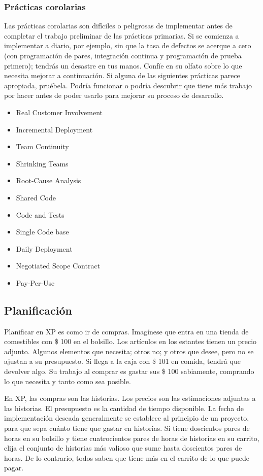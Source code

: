 \begin{spacing}{1.5}
		\subsubsection{Pr\'{a}cticas corolarias}
				Las prácticas corolarias son difíciles o peligrosas de implementar antes de completar el trabajo preliminar de las prácticas primarias. Si se comienza a implementar a diario, por ejemplo, sin que la tasa de defectos se acerque a cero (con programación de pares, integración continua y programación de prueba primero); tendrás un desastre en tus manos. Confíe en su olfato sobre lo que necesita mejorar a continuación. Si alguna de las siguientes prácticas parece apropiada, pruébela. Podría funcionar o podría descubrir que tiene más trabajo por hacer antes de poder usarlo para mejorar su proceso de desarrollo.
				\begin{itemize}
					\item Real Customer Involvement
					\item Incremental Deployment
					\item Team Continuity
					\item Shrinking Teams
					\item Root-Cause Analysis
					\item Shared Code
					\item Code and Tests
					\item Single Code base
					\item Daily Deployment
					\item Negotiated Scope Contract
					\item Pay-Per-Use
				\end{itemize}
	\subsection{Planificaci\'{o}n}
				Planificar en XP es como ir de compras. Imagínese que entra en una tienda de comestibles con \$ 100 en el bolsillo. Los artículos en los estantes tienen un precio adjunto. Algunos elementos que necesita; otros no; y otros que desee, pero no se ajustan a su presupuesto. Si llega a la caja con \$ 101 en comida, tendrá que devolver algo. Su trabajo al comprar es gastar sus \$ 100 sabiamente, comprando lo que necesita y tanto como sea posible.
				
				En XP, las compras son las historias. Los precios son las estimaciones adjuntas a las historias. El presupuesto es la cantidad de tiempo disponible. La fecha de implementación deseada generalmente se establece al principio de un proyecto, para que sepa cuánto tiene que gastar en historias. Si tiene doscientos pares de horas en su bolsillo y tiene cuatrocientos pares de horas de historias en su carrito, elija el conjunto de historias más valioso que sume hasta doscientos pares de horas. De lo contrario, todos saben que tiene más en el carrito de lo que puede pagar.	
				

\end{spacing}
